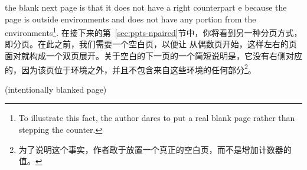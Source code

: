 \begin{paracol}{2}
the blank next page is that it does not have a right counterpart
\parapag{}e because the page is outside  environments and does
not have any portion from the environments\footnote{%
To illustrate this fact, the author dares to put a real blank page rather
than stepping the  counter.}.
\switchcolumn
在接下来的第~\ref{sec:ppts-npaired}节中，你将看到另一种\parapag{}分页方式，即\npaired{}分页。在此之前，我们需要一个空白页，以便让\npaired{} \parapag{}从偶数页开始，这样左右的页面对就构成一个双页展开。关于空白的下一页的一个简短说明是，它没有右侧对应的\parapag{}，因为该页位于环境之外，并且不包含来自这些环境的任何部分\footnote{为了说明这个事实，作者敢于放置一个真正的空白页，而不是增加计数器的值。}。
   
\end{paracol}

 \newpage\vspace*{\fill}\centerline{(intentionally blanked page)}\vfill
 